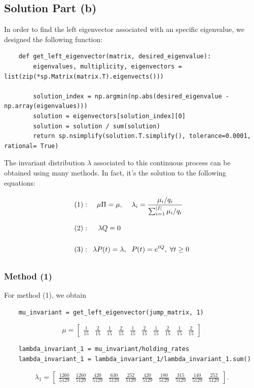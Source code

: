 \subsection*{Solution Part (b)}

In order to find the left eigenvector associated with an specific eigenvalue, we designed the following function:

\begin{verbatim}
    def get_left_eigenvector(matrix, desired_eigenvalue):
        eigenvalues, multiplicity, eigenvectors = list(zip(*sp.Matrix(matrix.T).eigenvects()))

        solution_index = np.argmin(np.abs(desired_eigenvalue - np.array(eigenvalues)))
        solution = eigenvectors[solution_index][0]
        solution = solution / sum(solution)
        return sp.nsimplify(solution.T.simplify(), tolerance=0.0001, rational= True)
\end{verbatim}

The invariant distribution $\lambda$ associated to this continuous process can be obtained using many methods. In fact, it's the solution to the following equations:
\[ \everymath{\displaystyle}
\arraycolsep=4pt\def\arraystretch{2.5}
\begin{array}{rcl}
    (1): & \mu\Pi = \mu, & \lambda_i = \frac{\mu_i/q_i}{\sum_{i = 1}^{|I|} \mu_i/q_i}\\
    (2): & \lambda Q = 0\\
    (3): & \lambda P(t) = \lambda, & P(t) = e^{tQ},\; \forall t\geq 0
\end{array}\]

\subsubsection*{Method (1)}
For method (1), we obtain
\begin{verbatim}
    mu_invariant = get_left_eigenvector(jump_matrix, 1)
\end{verbatim}
\[ \mu = \left[\begin{matrix}\frac{1}{15} & \frac{2}{15} & \frac{1}{15} & \frac{2}{15} & \frac{1}{15} & \frac{2}{15} & \frac{1}{15} & \frac{2}{15} & \frac{1}{15} & \frac{2}{15}\end{matrix}\right]
\]
\begin{verbatim}
    lambda_invariant_1 = mu_invariant/holding_rates
    lambda_invariant_1 = lambda_invariant_1/lambda_invariant_1.sum()
\end{verbatim}
\[ \lambda_1 = \left[\begin{matrix}\frac{1260}{5129} & \frac{1260}{5129} & \frac{420}{5129} & \frac{630}{5129} & \frac{252}{5129} & \frac{420}{5129} & \frac{180}{5129} & \frac{315}{5129} & \frac{140}{5129} & \frac{252}{5129}\end{matrix}\right].
\]

